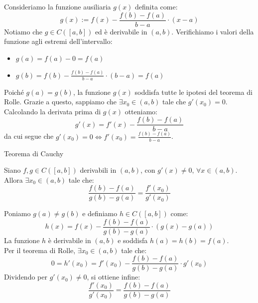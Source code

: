 \documentclass[12pt]{report}
\begin{document}
	\begin{dimostrazione}{}{}
		
		Consideriamo la funzione ausiliaria $g(x)$ definita come:
		\[
		g(x) := f(x) - \frac{f(b) - f(a)}{b - a} \cdot (x - a)
		\]
		Notiamo che $g \in C([a, b])$ ed è derivabile in $(a, b)$. Verifichiamo i valori della funzione agli estremi dell'intervallo:
		\begin{itemize}
			
			\item $g(a) = f(a) - 0 = f(a)$
			
			\item $g(b) = f(b) - \frac{f(b) - f(a)}{b - a} \cdot (b - a) = f(a)$
			
		\end{itemize}
		Poiché $g(a) = g(b)$, la funzione $g(x)$ soddisfa tutte le ipotesi del teorema di Rolle. Grazie a questo, sappiamo che $\exists x_0 \in (a, b)$ tale che $g'(x_0) = 0$.\\
		Calcolando la derivata prima di $g(x)$ otteniamo:
		\[
		g'(x) = f'(x) - \frac{f(b) - f(a)}{b - a}
		\]
		da cui segue che $g'(x_0) = 0 \iff f'(x_0) = \frac{f(b) - f(a)}{b - a}$.
		
	\end{dimostrazione}
	
	\begin{teorema}{Teorema di Cauchy}{}
		
		Siano $f, g \in C([a, b])$ derivabili in $(a, b)$, con $g'(x) \neq 0, \, \forall x \in (a, b)$.\\
		Allora $\exists x_0 \in (a, b)$ tale che:
		\[
		\frac{f(b) - f(a)}{g(b) - g(a)} = \frac{f'(x_0)}{g'(x_0)}
		\]
		
	\end{teorema}
	
	\begin{dimostrazione}{}{}
		
		Poniamo $g(a) \neq g(b)$ e definiamo $h \in C([a, b])$ come:
		\[
		h(x) = f(x) - \frac{f(b) - f(a)}{g(b) - g(a)} \cdot (g(x) - g(a))
		\]
		La funzione $h$ è derivabile in $(a, b)$ e soddisfa $h(a) = h(b) = f(a)$.\\
		Per il teorema di Rolle, $\exists x_0 \in (a, b)$ tale che:
		\[
		0 = h'(x_0) = f'(x_0) - \frac{f(b) - f(a)}{g(b) - g(a)} \cdot g'(x_0)
		\]
		Dividendo per $g'(x_0) \neq 0$, si ottiene infine:
		\[
		\frac{f'(x_0)}{g'(x_0)} = \frac{f(b) - f(a)}{g(b) - g(a)}
		\]
		
	\end{dimostrazione}
	
\end{document}
